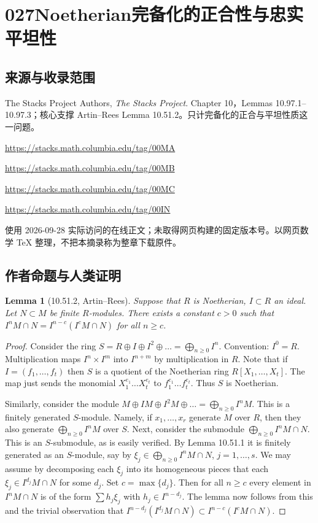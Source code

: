 \documentclass[UTF8,11pt]{ctexart}
\newtheorem*{lemma}{Lemma}
\theoremstyle{definition}
\begin{document}
\section*{027\quad Noetherian完备化的正合性与忠实平坦性}
\subsection*{来源与收录范围}
The Stacks Project Authors, \emph{The Stacks Project}. Chapter 10，Lemmas 10.97.1--10.97.3；核心支撑 Artin--Rees Lemma 10.51.2。只计完备化的正合与平坦性质这一问题。
\par\url{https://stacks.math.columbia.edu/tag/00MA}
\par\url{https://stacks.math.columbia.edu/tag/00MB}
\par\url{https://stacks.math.columbia.edu/tag/00MC}
\par\url{https://stacks.math.columbia.edu/tag/00IN}
\par 使用 2026-09-28 实际访问的在线正文；未取得网页构建的固定版本号。以网页数学 TeX 整理，不把本摘录称为整章下载原件。
\subsection*{作者命题与人类证明}
\begin{lemma}[10.51.2, Artin--Rees]
Suppose that $R$ is Noetherian, $I\subset R$ an ideal. Let $N\subset M$ be finite $R$-modules. There exists a constant $c>0$ such that $I^nM\cap N=I^{n-c}(I^cM\cap N)$ for all $n\geq c$.
\end{lemma}
\begin{proof}
Consider the ring $S=R\oplus I\oplus I^2\oplus\ldots=\bigoplus_{n\geq0}I^n$. Convention: $I^0=R$. Multiplication maps $I^n\times I^m$ into $I^{n+m}$ by multiplication in $R$. Note that if $I=(f_1,\ldots,f_t)$ then $S$ is a quotient of the Noetherian ring $R[X_1,\ldots,X_t]$. The map just sends the monomial $X_1^{e_1}\ldots X_t^{e_t}$ to $f_1^{e_1}\ldots f_t^{e_t}$. Thus $S$ is Noetherian.

Similarly, consider the module $M\oplus IM\oplus I^2M\oplus\ldots=\bigoplus_{n\geq0}I^nM$. This is a finitely generated $S$-module. Namely, if $x_1,\ldots,x_r$ generate $M$ over $R$, then they also generate $\bigoplus_{n\geq0}I^nM$ over $S$. Next, consider the submodule $\bigoplus_{n\geq0}I^nM\cap N$. This is an $S$-submodule, as is easily verified. By Lemma 10.51.1 it is finitely generated as an $S$-module, say by $\xi_j\in\bigoplus_{n\geq0}I^nM\cap N$, $j=1,\ldots,s$. We may assume by decomposing each $\xi_j$ into its homogeneous pieces that each $\xi_j\in I^{d_j}M\cap N$ for some $d_j$. Set $c=\max\{d_j\}$. Then for all $n\geq c$ every element in $I^nM\cap N$ is of the form $\sum h_j\xi_j$ with $h_j\in I^{n-d_j}$. The lemma now follows from this and the trivial observation that $I^{n-d_j}(I^{d_j}M\cap N)\subset I^{n-c}(I^cM\cap N)$.
\end{proof}
\end{document}
